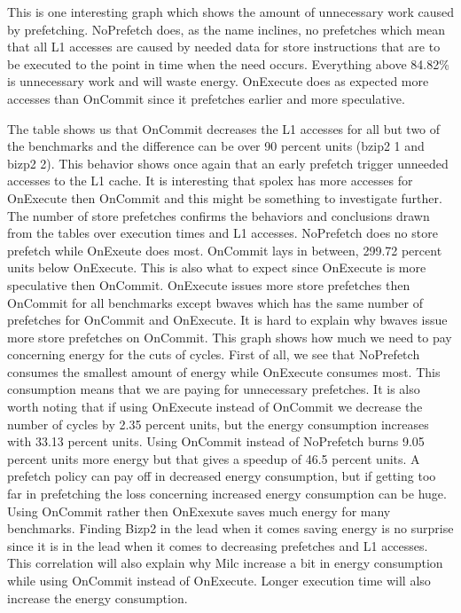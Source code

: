 This is one interesting graph which shows the amount of unnecessary work caused by prefetching. NoPrefetch does, as the name inclines, no prefetches which mean that all L1 accesses are caused by needed data for store instructions that are to be executed to the point in time when the need occurs. Everything above 84.82\% is unnecessary work and will waste energy. OnExecute does as expected more accesses than OnCommit since it prefetches earlier and more speculative.

The table shows us that OnCommit decreases the L1 accesses for all but two of the benchmarks and the difference can be over 90 percent units (bzip2 1 and bizp2 2). This behavior shows once again that an early prefetch trigger unneeded accesses to the L1 cache. It is interesting that spolex has more accesses for OnExecute then OnCommit and this might be something to investigate further.  
\resSp
{}
The number of store prefetches confirms the behaviors and conclusions drawn from the tables over execution times and L1 accesses. NoPrefetch does no store prefetch while OnExeute does most. OnCommit lays in between, 299.72 percent units below OnExecute. This is also what to expect since OnExecute is more speculative then OnCommit.  
OnExecute issues more store prefetches then OnCommit for all benchmarks except bwaves which has the same number of prefetches for OnCommit and OnExecute. It is hard to explain why bwaves issue more store prefetches on OnCommit.
\resEnergy
{}
This graph shows how much we need to pay concerning energy for the cuts of cycles. First of all, we see that NoPrefetch consumes the smallest amount of energy while OnExecute consumes most. This consumption means that we are paying for unnecessary prefetches. It is also worth noting that if using OnExecute instead of OnCommit we decrease the number of cycles by 2.35 percent units, but the energy consumption increases with 33.13 percent units. Using OnCommit instead of NoPrefetch burns 9.05 percent units more energy but that gives a speedup of 46.5 percent units. A prefetch policy can pay off in decreased energy consumption, but if getting too far in prefetching the loss concerning increased energy consumption can be huge.
Using OnCommit rather then OnExexute saves much energy for many benchmarks. Finding Bizp2 in the lead when it comes saving energy is no surprise since it is in the lead when it comes to decreasing prefetches and L1 accesses. This correlation will also explain why Milc increase a bit in energy consumption while using OnCommit instead of OnExecute. Longer execution time will also increase the energy consumption.

